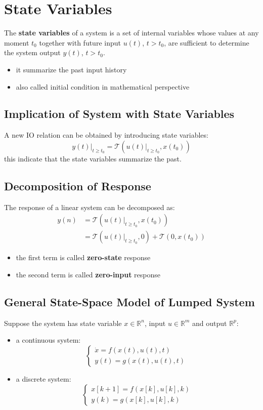 \documentclass[10pt,a4paper,oneside]{article}
\begin{document}
\section{State Variables}
The \textbf{state variables} of a system is a set of internal variables whose values at any moment $t_0$ together with future input $u(t)$, $t>t_0$, are sufficient to determine the system output $y(t)$, $t>t_0$.
\begin{itemize}
	\item it summarize the past input history
	\item also called initial condition in mathematical perspective
\end{itemize}

\subsection{Implication of System with State Variables}
A new IO relation can be obtained by introducing state variables:
\[
y(t) | _{t \geq t_0} = \mathcal{T} \left(u(t) | _{t\geq t_0} , x(t_0)\right)
\]
this indicate that the state variables summarize the past.

\subsection{Decomposition of Response}
The response of a linear system can be decomposed as:
\begin{align*}
y(n) &= \mathcal{T} \left(u(t) | _{t\geq t_0} , x(t_0)\right)\\
&=\mathcal{T} \left(u(t) | _{t\geq t_0} , 0\right) +\mathcal{T} \left(0, x(t_0)\right)
\end{align*}
\begin{itemize}
	\item the first term is called \textbf{zero-state} response
	\item the second term is called \textbf{zero-input} response
\end{itemize}

\subsection{General State-Space Model of Lumped System}
Suppose the system has state variable $x \in \mathbb{R}^n$, input $u \in \mathbb{R}^m$ and output $\mathbb{R}^p$:
\begin{itemize}
	\item a continuous system:
	\[
	\left\{
	\begin{array}{ll}
	\dot{x}= f(x(t), u(t), t)\\
	y(t) = g(x(t), u(t), t)\
	\end{array}\right.
	\]
	\item a discrete system:
	\[
	\left\{
	\begin{array}{ll}
	x[k+1] = f(x[k], u[k], k)\\
	y(k) = g(x[k], u[k], k)\
	\end{array}\right.
	\]
\end{itemize}
\end{document}
